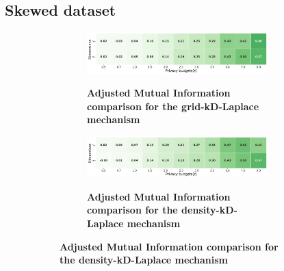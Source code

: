 \subsection{Skewed dataset} \label{appendix:results-mechanism-utility-skewed-dataset}

\begin{figure}[H]
    \centering
    \begin{subfigure}[b]{0.90\textwidth}
        \begin{subfigure}[c]{1\textwidth}
            \caption{\textbf{Adjusted Mutual Information comparison for the grid-kD-Laplace mechanism}}
            \includegraphics[width=1\textwidth]{Results/kd-laplace/grid-kd-Laplace/skewed-dataset/ami.png}
            \label{fig:ami_skewed-dataset_comparison_grid-kd_2d}
        \end{subfigure}
        \vfill %
        \begin{subfigure}[c]{1\textwidth}
            \caption{\textbf{Adjusted Mutual Information comparison for the density-kD-Laplace mechanism}}
            \includegraphics[width=1\textwidth]{Results/kd-laplace/density-kd-Laplace/skewed-dataset/ami.png}
            \label{fig:ami_skewed-dataset_comparison_density-kd_2d}
        \end{subfigure}
    \end{subfigure}
    \hfill %
    \begin{subfigure}[b]{0.075\textwidth}

\end{subfigure}
\end{figure}
